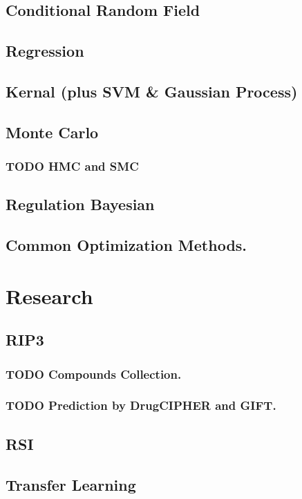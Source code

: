 \documentclass[11pt]{article}
\begin{document}
\subsection{Conditional Random Field}
\label{sec-2-2}
\subsection{Regression}
\label{sec-2-3}
\subsection{Kernal (plus SVM \& Gaussian Process)}
\label{sec-2-4}
\subsection{Monte Carlo}
\label{sec-2-5}
\subsubsection{\textbf{TODO} HMC and SMC}
\label{sec-2-5-1}
\subsection{Regulation Bayesian}
\label{sec-2-6}
\subsection{Common Optimization Methods.}
\label{sec-2-7}
\section{Research}
\label{sec-3}
\subsection{RIP3}
\label{sec-3-1}
\subsubsection{\textbf{TODO} Compounds Collection.}
\label{sec-3-1-1}
\subsubsection{\textbf{TODO} Prediction by DrugCIPHER and GIFT.}
\label{sec-3-1-2}
\subsection{RSI}
\label{sec-3-2}
\subsection{Transfer Learning}
\label{sec-3-3}
\end{document}
